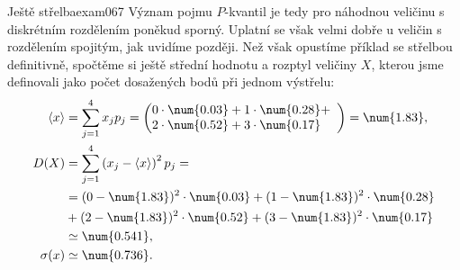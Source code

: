 \begin{matehexam}{Ještě střelba}{exam067}
  Význam pojmu \(P\)-kvantil je tedy pro náhodnou veličinu s diskrétním rozdělením poněkud sporný.
  Uplatní se však velmi dobře u veličin s rozdělením spojitým, jak uvidíme později. Než však
  opustíme příklad se střelbou definitivně, spočtěme si ještě střední hodnotu a rozptyl veličiny
  \(X\), kterou jsme definovali jako počet dosažených bodů při jednom výstřelu:
  \begin{align*}
    \langle x \rangle 
        &=  \sum_{j=1}^{4}x_jp_j =                                                              
            \left(
              \begin{array}{@{}l}
                0\cdot\num{0.03} + 1\cdot\num{0.28} + \\
                2\cdot\num{0.52} + 3\cdot\num{0.17}
              \end{array}
            \right) = \num{1.83},                                                              \\
    D(X)  &= \sum_{j=1}^{4}\left(x_j - \langle x \rangle \right)^2p_j =                        \\
          &= (0-\num{1.83})^2\cdot\num{0.03}+(1-\num{1.83})^2\cdot\num{0.28}                   \\
          &+ (2-\num{1.83})^2\cdot\num{0.52}+(3-\num{1.83})^2\cdot\num{0.17}                   \\
              &\simeq\num{0.541},                                                              \\
    \sigma(x) &\simeq\num{0.736}.
  \end{align*}


\end{matehexam}
